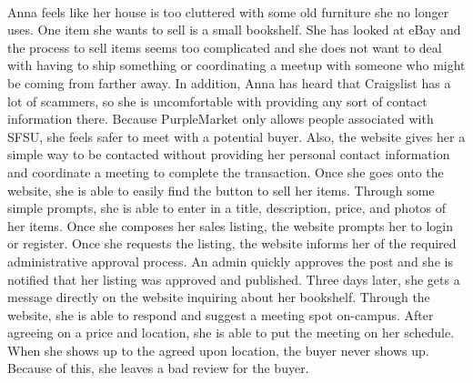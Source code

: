 \begin{description}[font=\bfseries\itshape]
\item[Use Case 5: Selling furniture (Anna)]\hfill\\
Anna feels like her house is too cluttered with some old furniture she no longer uses.  One item she wants to sell is a small bookshelf.  She has looked at eBay and the process to sell items seems too complicated and she does not want to deal with having to ship something or coordinating a meetup with someone who might be coming from farther away.  In addition, Anna has heard that Craigslist has a lot of scammers, so she is uncomfortable with providing any sort of contact information there.  Because PurpleMarket only allows people associated with SFSU, she feels safer to meet with a potential buyer.  Also, the website gives her a simple way to be contacted without providing her personal contact information and coordinate a meeting to complete the transaction.  Once she goes onto the website, she is able to easily find the button to sell her items.  Through some simple prompts, she is able to enter in a title, description, price, and photos of her items.  Once she composes her sales listing, the website prompts her to login or register.  Once she requests the listing, the website informs her of the required administrative approval process.  An admin quickly approves the post and she is notified that her listing was approved and published.  Three days later, she gets a message directly on the website inquiring about her bookshelf.  Through the website, she is able to respond and suggest a meeting spot on-campus.  After agreeing on a price and location, she is able to put the meeting on her schedule.  When she shows up to the agreed upon location, the buyer never shows up.  Because of this, she leaves a bad review for the buyer.


\end{description}
